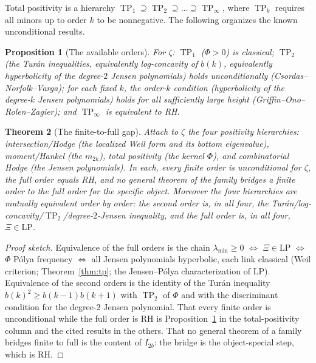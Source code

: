 \documentclass[11pt]{amsart}
\newtheorem{theorem}{Theorem}[section]
\newtheorem{proposition}[theorem]{Proposition}
\theoremstyle{definition}
\theoremstyle{remark}
\DeclareMathOperator{\TP}{TP}
\newcommand{\Xib}{\Xi}
\newcommand{\LP}{\mathrm{LP}}
\begin{document}
Total positivity is a hierarchy $\TP_1\supseteq\TP_2\supseteq\dots\supseteq
\TP_\infty$, where $\TP_k$ requires all minors up to order $k$ to be
nonnegative. The following organizes the known unconditional results.

\begin{proposition}[The available orders]\label{prop:orders}
For $\zeta$: $\TP_1$ ($\Phi>0$) is classical; $\TP_2$ (the Tur\'an
inequalities, equivalently log-concavity of $b(k)$, equivalently hyperbolicity
of the degree-$2$ Jensen polynomials) holds unconditionally
{\rm(Csordas--Norfolk--Varga)}; for each fixed $k$, the order-$k$ condition
(hyperbolicity of the degree-$k$ Jensen polynomials) holds for all sufficiently
large height {\rm(Griffin--Ono--Rolen--Zagier)}; and $\TP_\infty$ is equivalent
to RH.
\end{proposition}

\begin{theorem}[The finite-to-full gap]\label{thm:gap}
Attach to $\zeta$ the four positivity hierarchies: intersection/Hodge (the
localized Weil form and its bottom eigenvalue), moment/Hankel (the $m_{2k}$),
total positivity (the kernel $\Phi$), and combinatorial Hodge (the Jensen
polynomials). In each, every finite order is unconditional for $\zeta$, the
full order equals RH, and no general theorem of the family bridges a finite
order to the full order for the specific object. Moreover the four hierarchies
are mutually equivalent order by order: the second order is, in all four, the
Tur\'an/log-concavity/$\TP_2$/degree-$2$-Jensen inequality, and the full order
is, in all four, $\Xib\in\LP$.
\end{theorem}
\begin{proof}[Proof sketch]
Equivalence of the full orders is the chain
$\lambda_{\min}\ge0$ $\iff$ $\Xib\in\LP$ $\iff$ $\Phi$ P\'olya frequency $\iff$
all Jensen polynomials hyperbolic, each link classical (Weil criterion;
Theorem~\ref{thm:tp}; the Jensen--P\'olya characterization of $\LP$).
Equivalence of the second orders is the identity of the Tur\'an inequality
$b(k)^2\ge b(k-1)b(k+1)$ with $\TP_2$ of $\Phi$ and with the discriminant
condition for the degree-$2$ Jensen polynomial. That every finite order is
unconditional while the full order is RH is Proposition~\ref{prop:orders} in
the total-positivity column and the cited results in the others. That no
general theorem of a family bridges finite to full is the content of $I_{2b}$:
the bridge is the object-special step, which is RH.
\end{proof}
\end{document}
